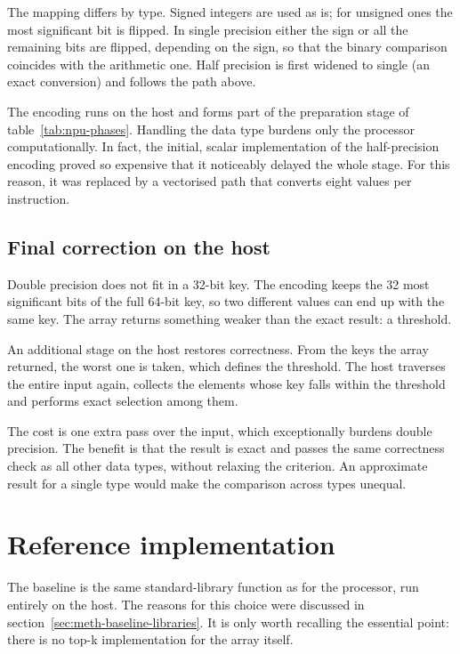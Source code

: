 The mapping differs by type. Signed integers are used as is; for unsigned ones
the most significant bit is flipped. In single precision either the sign or all
the remaining bits are flipped, depending on the sign, so that the binary
comparison coincides with the arithmetic one. Half precision is first widened
to single (an exact conversion) and follows the path above.

The encoding runs on the host and forms part of the preparation stage of
table~\ref{tab:npu-phases}. Handling the data type burdens only the processor
computationally. In fact, the initial, scalar implementation of the
half-precision encoding proved so expensive that it noticeably delayed the
whole stage. For this reason, it was replaced by a vectorised path that
converts eight values per instruction.

\subsection{Final correction on the host}
\label{sec:npu-refinement}

Double precision does not fit in a 32-bit key. The encoding keeps the 32 most
significant bits of the full 64-bit key, so two different values can end up
with the same key. The array returns something weaker than the exact result: a
threshold.

An additional stage on the host restores correctness. From the keys the array
returned, the worst one is taken, which defines the threshold. The host
traverses the entire input again, collects the elements whose key falls within
the threshold and performs exact selection among them.

The cost is one extra pass over the input, which exceptionally burdens double
precision. The benefit is that the result is exact and passes the same
correctness check as all other data types, without relaxing the criterion. An
approximate result for a single type would make the comparison across types
unequal.

\section{Reference implementation}
\label{sec:npu-reference}

The baseline is the same standard-library function as for the processor, run
entirely on the host. The reasons for this choice were discussed in
section~\ref{sec:meth-baseline-libraries}. It is only worth recalling the
essential point: there is no top-k implementation for the array itself.

